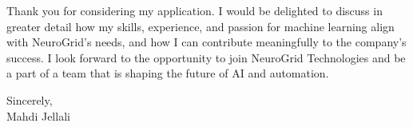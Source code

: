 \documentclass[letterpaper,11pt]{article}
\begin{document}
    Thank you for considering my application. I would be delighted to discuss in greater detail how my skills, experience, and passion for machine learning align with NeuroGrid's needs, and how I can contribute meaningfully to the company's success. I look forward to the opportunity to join NeuroGrid Technologies and be a part of a team that is shaping the future of AI and automation.

    Sincerely,\\[12pt]

    Mahdi Jellali
\end{document}
